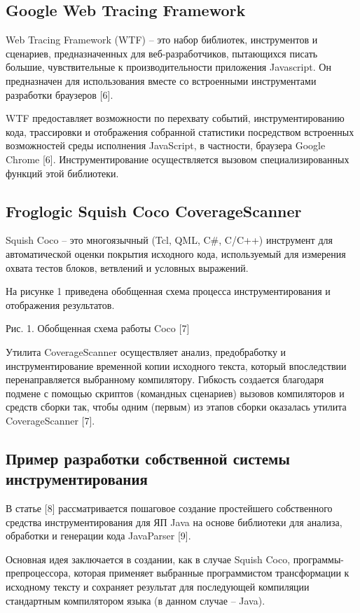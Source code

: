 \subsection{Google Web Tracing Framework}
Web Tracing Framework (WTF) -- это набор библиотек, инструментов и сценариев, предназначенных для веб-разработчиков, пытающихся писать большие, чувствительные к производительности приложения Javascript. Он предназначен для использования вместе со встроенными инструментами разработки браузеров [6]. 

WTF предоставляет возможности по перехвату событий, инструментированию кода, трассировки и отображения собранной статистики посредством встроенных возможностей среды исполнения JavaScript, в частности, браузера Google Chrome [6]. Инструментирование осуществляется вызовом специализированных функций этой библиотеки.

\subsection{Froglogic Squish Coco CoverageScanner}
Squish Coco -- это многоязычный (Tcl, QML, C\#, C/C++) инструмент для автоматической оценки покрытия исходного кода, используемый для измерения охвата тестов блоков, ветвлений и условных выражений.

На рисунке 1 приведена обобщенная схема процесса инструментирования и отображения результатов.
 
Рис. 1. Обобщенная схема работы Coco [7]

Утилита CoverageScanner осуществляет анализ, предобработку и инструментирование временной копии исходного текста, который впоследствии перенаправляется выбранному компилятору. Гибкость создается благодаря подмене с помощью скриптов (командных сценариев) вызовов компиляторов и средств сборки так, чтобы одним (первым) из этапов сборки оказалась утилита CoverageScanner [7].

\subsection{Пример разработки собственной системы инструментирования}
В статье [8] рассматривается пошаговое создание простейшего собственного средства инструментирования для ЯП Java на основе библиотеки для анализа, обработки и генерации кода JavaParser [9].

Основная идея заключается в создании, как в случае Squish Coco, программы-препроцессора, которая применяет выбранные программистом трансформации к исходному тексту и сохраняет результат для последующей компиляции стандартным компилятором языка (в данном случае -- Java).

